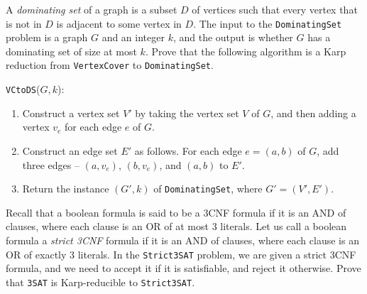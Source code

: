 \documentclass[10pt,addpoints]{exam}
\begin{document}
\newpage


\begin{prob} A \textit{dominating set} of a graph is a subset $D$ of vertices such that every vertex that is not in $D$ is adjacent to some vertex in $D$. The input to the \texttt{DominatingSet} problem is a graph $G$ and an integer $k$, and the output is whether $G$ has a dominating set of size at most $k$. Prove that the following algorithm is a Karp reduction from \texttt{VertexCover} to \texttt{DominatingSet}.

\texttt{VCtoDS}($G,k$):
\begin{enumerate}
\item Construct a vertex set $V'$ by taking the vertex set $V$ of $G$, and then adding a vertex $v_e$ for each edge $e$ of $G$.
\item Construct an edge set $E'$ as follows. For each edge $e=(a,b)$ of $G$, add three edges -- $(a,v_e)$, $(b,v_e)$, and $(a,b)$ to $E'$.
\item Return the instance $(G',k)$ of \texttt{DominatingSet}, where $G'=(V',E')$.
\end{enumerate}

\end{prob}

\newpage


\begin{prob} Recall that a boolean formula is said to be a 3CNF formula if it is an AND of clauses, where each clause is an OR of at most $3$ literals. Let us call a boolean formula a \textit{strict 3CNF} formula if it is an AND of clauses, where each clause is an OR of exactly $3$ literals. In the \texttt{Strict3SAT} problem, we are given a strict 3CNF formula, and we need to accept it if it is satisfiable, and reject it otherwise. Prove that \texttt{3SAT} is Karp-reducible to \texttt{Strict3SAT}.

\end{prob}

\newpage
\end{document}
